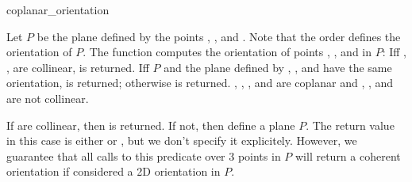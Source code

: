 \begin{ccRefFunction}{coplanar_orientation}

         {Let $P$ be the plane defined by the points , ,
          and . Note that the order defines the orientation of
          $P$. The function computes the orientation of points , 
          , and  in $P$: Iff , ,  are
          collinear,  is returned. Iff $P$ and the plane 
          defined by , , and  have the same orientation, 
           is returned; otherwise  is returned.  
          \ccPrecond {}, , , and  are coplanar and
          , , and  are not collinear.}

{If  are collinear, then  is returned.
If not, then  define a plane $P$.  The return value in this case is
either  or , but we don't specify it explicitely.
However, we guarantee that all calls to this predicate over 3 points in $P$
will return a coherent orientation if considered a 2D orientation in $P$.}

\ccSeeAlso

 \\
 \\
 \\

\end{ccRefFunction}

